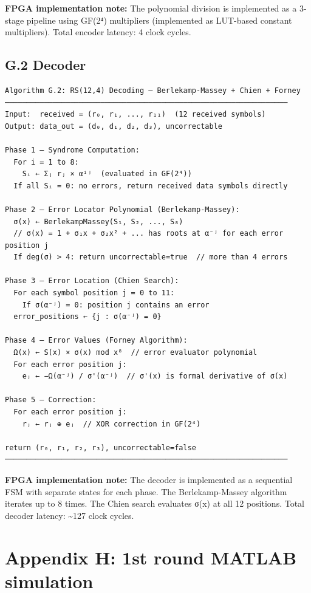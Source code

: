 \documentclass[
  english,
  12pt,
]{report}
\begin{document}
\textbf{FPGA implementation note:} The polynomial division is
implemented as a 3-stage pipeline using GF(2⁴) multipliers (implemented
as LUT-based constant multipliers). Total encoder latency: 4 clock
cycles.

\subsection{G.2 Decoder}\label{g.2-decoder}

\begin{verbatim}
Algorithm G.2: RS(12,4) Decoding — Berlekamp-Massey + Chien + Forney
─────────────────────────────────────────────────────────────────
Input:  received = (r₀, r₁, ..., r₁₁)  (12 received symbols)
Output: data_out = (d₀, d₁, d₂, d₃), uncorrectable

Phase 1 — Syndrome Computation:
  For i = 1 to 8:
    Sᵢ ← Σⱼ rⱼ × αⁱʲ  (evaluated in GF(2⁴))
  If all Sᵢ = 0: no errors, return received data symbols directly

Phase 2 — Error Locator Polynomial (Berlekamp-Massey):
  σ(x) ← BerlekampMassey(S₁, S₂, ..., S₈)
  // σ(x) = 1 + σ₁x + σ₂x² + ... has roots at α⁻ʲ for each error position j
  If deg(σ) > 4: return uncorrectable=true  // more than 4 errors

Phase 3 — Error Location (Chien Search):
  For each symbol position j = 0 to 11:
    If σ(α⁻ʲ) = 0: position j contains an error
  error_positions ← {j : σ(α⁻ʲ) = 0}

Phase 4 — Error Values (Forney Algorithm):
  Ω(x) ← S(x) × σ(x) mod x⁸  // error evaluator polynomial
  For each error position j:
    eⱼ ← −Ω(α⁻ʲ) / σ'(α⁻ʲ)  // σ'(x) is formal derivative of σ(x)

Phase 5 — Correction:
  For each error position j:
    rⱼ ← rⱼ ⊕ eⱼ  // XOR correction in GF(2⁴)

return (r₀, r₁, r₂, r₃), uncorrectable=false
─────────────────────────────────────────────────────────────────
\end{verbatim}

\textbf{FPGA implementation note:} The decoder is implemented as a
sequential FSM with separate states for each phase. The Berlekamp-Massey
algorithm iterates up to 8 times. The Chien search evaluates σ(x) at all
12 positions. Total decoder latency: \textasciitilde127 clock cycles.

\section{Appendix H: 1st round MATLAB
simulation}\label{appendix-h-1st-round-matlab-simulation}
\end{document}
